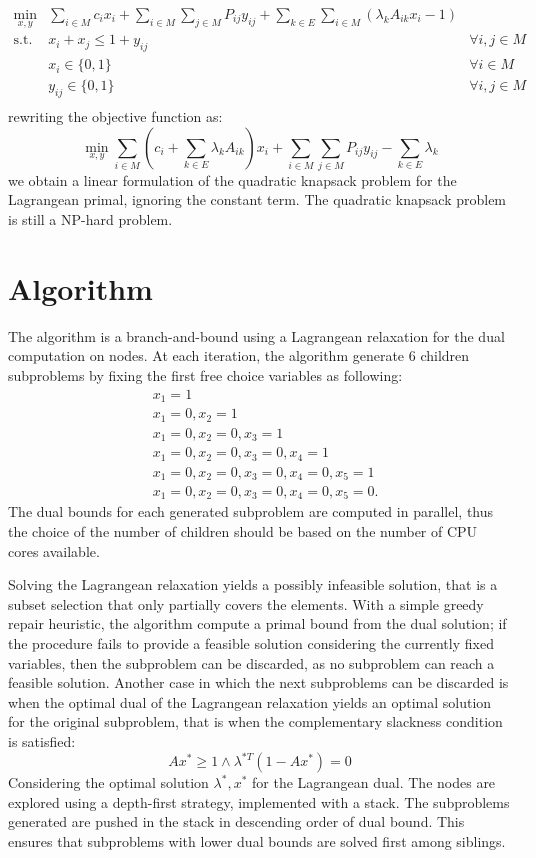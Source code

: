\documentclass[a4paper]{article}
\begin{document}
\begin{align*}
	\min_{x,y} & \sum_{i\in M} c_i x_i + \sum_{i \in M} \sum_{j \in M} P_{ij} y_{ij} + \sum_{k \in E}\sum_{i\in M} \left(\lambda_k A_{ik} x_i - 1\right)  & \\
	\text{s.t. }
	& x_i + x_j \le 1 + y_{ij} & \forall i,j \in M \\
	& x_i \in \{0, 1\} & \forall i \in M \\
	& y_{ij} \in \{0, 1\} & \forall i,j \in M\\
\end{align*}
rewriting the objective function as:
$$
\min_{x,y} \sum_{i\in M} \left(c_i + \sum_{k \in E} \lambda_k A_{ik}\right) x_i + \sum_{i \in M} \sum_{j \in M} P_{ij} y_{ij} - \sum_{k \in E} \lambda_k
$$
we obtain a linear formulation of the quadratic knapsack problem for the Lagrangean primal, ignoring the constant term. The quadratic knapsack problem is still a NP-hard problem.

\section{Algorithm}

The algorithm is a branch-and-bound using a Lagrangean relaxation for the dual computation on nodes. At each iteration, the algorithm generate 6 children subproblems by fixing the first free choice variables as following:
\begin{align*}
&x_1 = 1\\
&x_1 = 0, x_2 = 1\\
&x_1 = 0, x_2 = 0, x_3 = 1\\
&x_1 = 0, x_2 = 0, x_3 = 0, x_4 = 1\\
&x_1 = 0, x_2 = 0, x_3 = 0, x_4 = 0, x_5 = 1\\
&x_1 = 0, x_2 = 0, x_3 = 0, x_4 = 0, x_5 = 0.
\end{align*}
The dual bounds for each generated subproblem are computed in parallel, thus the choice of the number of children should be based on the number of CPU cores available. 

Solving the Lagrangean relaxation yields a possibly infeasible solution, that is a subset selection that only partially covers the elements. With a simple greedy repair heuristic, the algorithm compute a primal bound from the dual solution; if the procedure fails to provide a feasible solution considering the currently fixed variables, then the subproblem can be discarded, as no subproblem can reach a feasible solution. Another case in which the next subproblems can be discarded is when the optimal dual of the Lagrangean relaxation yields an optimal solution for the original subproblem, that is when the complementary slackness condition is satisfied:
$$
Ax^* \ge 1 \wedge \lambda^{*T} (1 - Ax^*) = 0
$$
Considering the optimal solution $\lambda^*, x^*$ for the Lagrangean dual. The nodes are explored using a depth-first strategy, implemented with a stack. The subproblems generated are pushed in the stack in descending order of dual bound. This ensures that subproblems with lower dual bounds are solved first among siblings.
\end{document}
